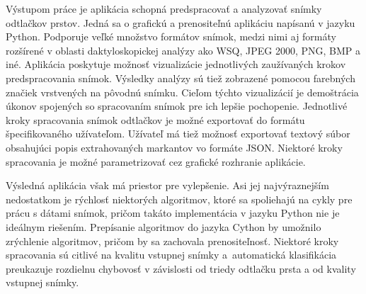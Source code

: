   Výstupom práce je aplikácia schopná predspracovať a analyzovať snímky odtlačkov prstov. Jedná sa o grafickú a prenositeľnú aplikáciu napísanú v jazyku
  Python. Podporuje veľké množstvo formátov snímok, medzi nimi aj formáty rozšírené v oblasti daktyloskopickej analýzy ako WSQ, JPEG 2000, PNG, BMP a iné.
  Aplikácia poskytuje možnosť vizualizácie jednotlivých zaužívaných krokov predspracovania snímok. Výsledky analýzy sú tiež zobrazené pomocou farebných
  značiek vrstvených na pôvodnú snímku. Cieľom týchto vizualizácií je demoštrácia úkonov spojených so spracovaním snímok pre ich lepšie pochopenie.
  Jednotlivé kroky spracovania snímok odtlačkov je možné exportovať do formátu špecifikovaného užívateľom.
  Užívateľ má tiež možnosť exportovať textový súbor obsahujúci popis extrahovaných markantov vo formáte JSON.
  Niektoré kroky spracovania je možné parametrizovať cez grafické rozhranie aplikácie.

  Výsledná aplikácia však má priestor pre vylepšenie. Asi jej najvýraznejším nedostatkom je rýchlosť niektorých algoritmov, ktoré sa spoliehajú na
  cykly pre prácu s dátami snímok, pričom takáto implementácia v jazyku Python nie je ideálnym riešením. Prepísanie algoritmov do jazyka Cython by umožnilo
  zrýchlenie algoritmov, pričom by sa zachovala prenositeľnosť. Niektoré kroky spracovania sú citlivé na kvalitu vstupnej snímky a~automatická
  klasifikácia preukazuje rozdielnu chybovosť v závislosti od triedy odtlačku prsta a od kvality vstupnej snímky.

